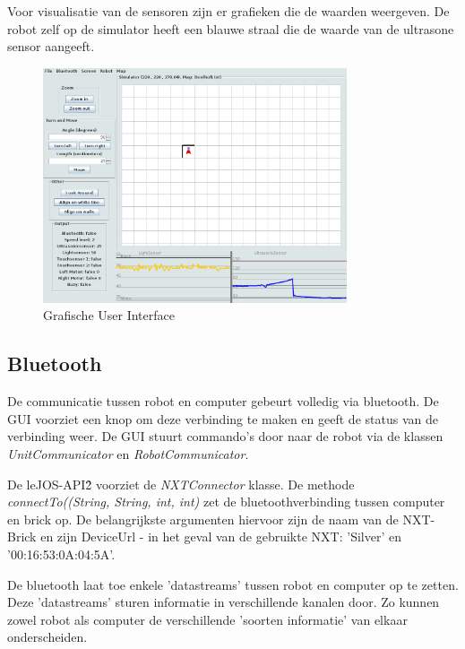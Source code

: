 \documentclass[tt3]{penoverslag}
\begin{document}
Voor visualisatie van de sensoren zijn er grafieken die de waarden weergeven. De robot zelf op de simulator heeft een blauwe straal die de waarde van de ultrasone sensor aangeeft. 

\begin{figure}[tbp]
\begin{center}
    \includegraphics[width=0.8\textwidth]{GUI}
    \caption{Grafische User Interface}
	\label{fig:gui}
\end{center}
\end{figure}

\subsection{Bluetooth} %
\label{ssec:bluetooth}
De communicatie tussen robot en computer gebeurt volledig via bluetooth. De GUI voorziet een knop om deze verbinding te maken en geeft de status van de verbinding weer. De GUI stuurt commando's door naar de robot via de klassen \textit{UnitCommunicator} en \textit{RobotCommunicator}.

De leJOS-API\^{2} voorziet de \textit{NXTConnector} klasse. De methode \textit{connectTo((String, String, int, int)} zet de bluetoothverbinding tussen computer en brick op. De belangrijkste argumenten hiervoor zijn de naam van de NXT-Brick en zijn DeviceUrl  - in het geval van de gebruikte NXT: 'Silver' en '00:16:53:0A:04:5A'.

De bluetooth laat toe enkele 'datastreams' tussen robot en computer op te zetten. Deze 'datastreams' sturen informatie in verschillende kanalen door. Zo kunnen zowel robot als computer de verschillende 'soorten informatie' van elkaar onderscheiden.
\end{document}
